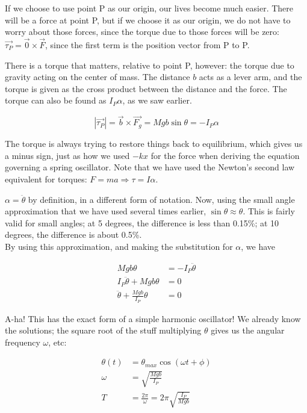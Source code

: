 If we choose to use point P as our origin, our lives become much easier. There will be a force at point P, but if we choose it as our origin, we do not have to worry about those forces, since the torque due to those forces will be zero: $\vec{\tau_P} = \vec{0} \times \vec{F}$, since the first term is the position vector from P to P.

There is a torque that matters, relative to point P, however: the torque due to gravity acting on the center of mass. The distance $b$ acts as a lever arm, and the torque is given as the cross product between the distance and the force. The torque can also be found as $I_P \alpha$, as we saw earlier.

\begin{equation}
|\vec{\tau_P}| = \vec{b} \times \vec{F_g} = M g b \sin \theta = - I_P \alpha
\end{equation}

The torque is always trying to restore things back to equilibrium, which gives us a minus sign, just as how we used $- k x$ for the force when deriving the equation governing a spring oscillator. Note that we have used the Newton's second law equivalent for torques: $F = m a \Rightarrow \tau = I \alpha$.

$\alpha = \ddot{\theta}$ by definition, in a different form of notation. Now, using the small angle approximation that we have used several times earlier, $\sin \theta \approx \theta$. This is fairly valid for small angles; at 5 degrees, the difference is less than 0.15\%; at 10 degrees, the difference is about 0.5\%.\\
By using this approximation, and making the substitution for $\alpha$, we have

\begin{align}
M g b \theta &= - I_P \ddot{\theta}\\
I_P \ddot{\theta} + M g b \theta &= 0\\
\ddot{\theta} + \frac{M g b}{I_P} \theta &= 0
\end{align}

A-ha! This has the exact form of a simple harmonic oscillator! We already know the solutions; the square root of the stuff multiplying $\theta$ gives us the angular frequency $\omega$, etc:

\begin{align}
\theta(t) &= \theta_{max} \cos(\omega t + \phi)\\
\omega    &= \sqrt{\frac{M g b}{I_P}}\\
T         &= \frac{2 \pi}{\omega} = 2 \pi \sqrt{\frac{I_P}{M g b}}
\end{align}

